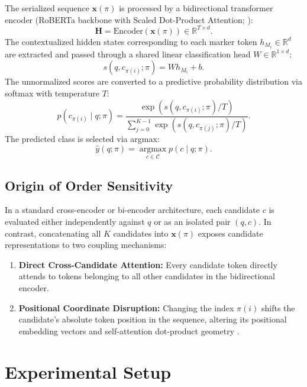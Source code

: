 \documentclass[11pt,a4paper]{article}
\begin{document}
The serialized sequence $\mathbf{x}(\pi)$ is processed by a bidirectional transformer encoder (RoBERTa backbone with Scaled Dot-Product Attention; \citealp{vaswani2017attention, liu2019roberta}):
\begin{equation}
\mathbf{H} = \text{Encoder}(\mathbf{x}(\pi)) \in \mathbb{R}^{T \times d}.
\end{equation}
The contextualized hidden states corresponding to each marker token $h_{M_i} \in \mathbb{R}^d$ are extracted and passed through a shared linear classification head $W \in \mathbb{R}^{1 \times d}$:
\begin{equation}
s(q, c_{\pi(i)}; \pi) = W h_{M_i} + b.
\end{equation}
The unnormalized scores are converted to a predictive probability distribution via softmax with temperature $T$:
\begin{equation}
p(c_{\pi(i)} \mid q; \pi) = \frac{\exp(s(q, c_{\pi(i)}; \pi) / T)}{\sum_{j=0}^{K-1} \exp(s(q, c_{\pi(j)}; \pi) / T)}.
\end{equation}
The predicted class is selected via argmax:
\begin{equation}
\hat{y}(q; \pi) = \operatorname*{argmax}_{c \in \mathcal{C}} p(c \mid q; \pi).
\end{equation}

\subsection{Origin of Order Sensitivity}

In a standard cross-encoder or bi-encoder architecture, each candidate $c$ is evaluated either independently against $q$ or as an isolated pair $(q, c)$. In contrast, concatenating all $K$ candidates into $\mathbf{x}(\pi)$ exposes candidate representations to two coupling mechanisms:
\begin{enumerate}
    \item \textbf{Direct Cross-Candidate Attention:} Every candidate token directly attends to tokens belonging to all other candidates in the bidirectional encoder.
    \item \textbf{Positional Coordinate Disruption:} Changing the index $\pi(i)$ shifts the candidate's absolute token position in the sequence, altering its positional embedding vectors and self-attention dot-product geometry \citep{dufter2022position}.
\end{enumerate}

\section{Experimental Setup}
\end{document}
